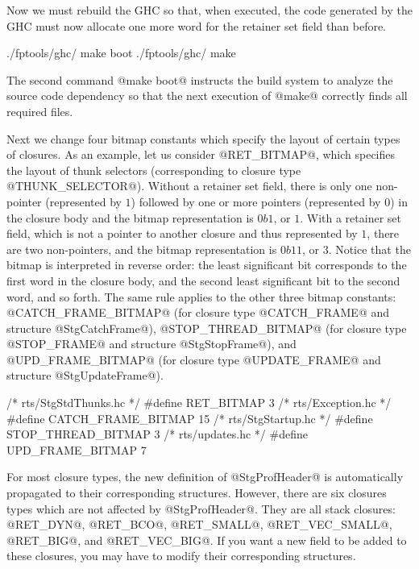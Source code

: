 \documentclass{article}
\begin{document}
Now we must rebuild the GHC so that, when executed, the code generated by 
the GHC must now allocate one more word for the retainer set field than before.

\begin{code}
./fptools/ghc/  make boot
./fptools/ghc/  make
\end{code}

The second command @make boot@ instructs the build system to analyze
the source code dependency so that the next execution of @make@ correctly
finds all required files.

Next we change four bitmap constants which specify the layout of
certain types of closures.
As an example, let us consider @RET_BITMAP@, which specifies the layout
of thunk selectors (corresponding to closure type @THUNK_SELECTOR@).
Without a retainer set field, there is only one non-pointer (represented
by $1$) followed by one or more pointers (represented by $0$) in the closure 
body and the bitmap representation is $0b1$, or $1$. 
With a retainer set field, which is not a pointer to another closure and thus
represented by $1$, there are two non-pointers, and the bitmap representation
is $0b11$, or $3$. Notice that the bitmap is interpreted in reverse order:
the least significant bit corresponds to the first word in the closure body,
and the second least significant bit to the second word, and so forth.
The same rule applies to the other three bitmap constants:
@CATCH_FRAME_BITMAP@ (for closure type @CATCH_FRAME@ and structure 
@StgCatchFrame@),
@STOP_THREAD_BITMAP@ (for closure type @STOP_FRAME@ and structure 
@StgStopFrame@), and
@UPD_FRAME_BITMAP@ (for closure type @UPDATE_FRAME@ and structure
@StgUpdateFrame@).

\begin{code}
/* rts/StgStdThunks.hc */
#define RET_BITMAP          3
/* rts/Exception.hc */
#define CATCH_FRAME_BITMAP  15
/* rts/StgStartup.hc */
#define STOP_THREAD_BITMAP  3
/* rts/updates.hc */
#define UPD_FRAME_BITMAP    7
\end{code}

For most closure types, the new definition of @StgProfHeader@ is
automatically propagated to their corresponding structures.
However, there are six closures types which are not affected by 
@StgProfHeader@. They are all stack closures:
@RET_DYN@, @RET_BCO@, @RET_SMALL@, @RET_VEC_SMALL@, @RET_BIG@, and
@RET_VEC_BIG@. 
If you want a new field to be added to these closures, you may
have to modify their corresponding structures.
\end{document}
